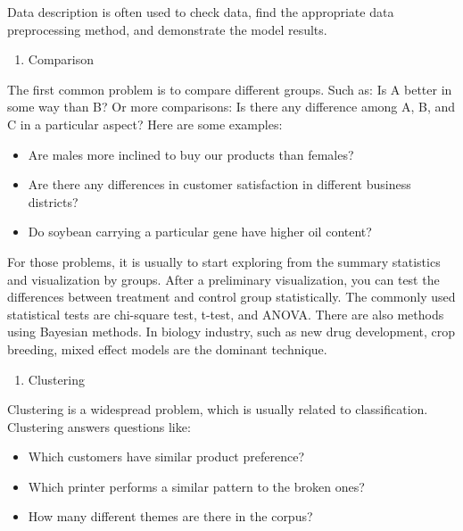 \documentclass[12pt,]{krantz}
\providecommand{\tightlist}{%
  \setlength{\itemsep}{0pt}\setlength{\parskip}{0pt}}
\theoremstyle{definition}
\theoremstyle{definition}
\theoremstyle{definition}
\theoremstyle{remark}
\begin{document}
Data description is often used to check data, find the appropriate data
preprocessing method, and demonstrate the model results.

\begin{enumerate}
\def\labelenumi{\arabic{enumi}.}
\setcounter{enumi}{1}
\tightlist
\item
  Comparison
\end{enumerate}

The first common problem is to compare different groups. Such as: Is A
better in some way than B? Or more comparisons: Is there any difference
among A, B, and C in a particular aspect? Here are some examples:

\begin{itemize}
\tightlist
\item
  Are males more inclined to buy our products than females?
\item
  Are there any differences in customer satisfaction in different
  business districts?
\item
  Do soybean carrying a particular gene have higher oil content?
\end{itemize}

For those problems, it is usually to start exploring from the summary
statistics and visualization by groups. After a preliminary
visualization, you can test the differences between treatment and
control group statistically. The commonly used statistical tests are
chi-square test, t-test, and ANOVA. There are also methods using
Bayesian methods. In biology industry, such as new drug development,
crop breeding, mixed effect models are the dominant technique.

\begin{enumerate}
\def\labelenumi{\arabic{enumi}.}
\setcounter{enumi}{2}
\tightlist
\item
  Clustering
\end{enumerate}

Clustering is a widespread problem, which is usually related to
classification. Clustering answers questions like:

\begin{itemize}
\tightlist
\item
  Which customers have similar product preference?
\item
  Which printer performs a similar pattern to the broken ones?
\item
  How many different themes are there in the corpus?
\end{itemize}
\end{document}
